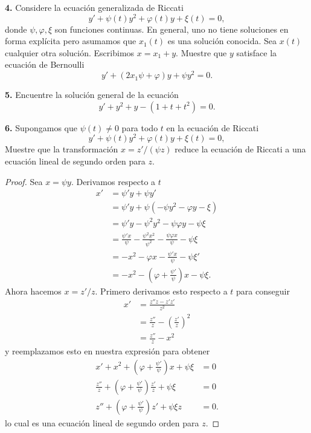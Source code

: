 \documentclass{article}
\newenvironment{statement}[1]{\smallskip\noindent\color[rgb]{1.00,0.00,0.50} {\bf #1.}}{}
\theoremstyle{definition}
\theoremstyle{remark}
\begin{document}
\begin{statement}{4}
  Considere la ecuaci\'on generalizada de Riccati
  \[
    y' + \psi(t) y^2 + \varphi(t) y + \xi(t) = 0,
  \]
  donde $\psi, \varphi, \xi$ son funciones continuas.
  En general, uno no tiene soluciones en forma expl\'icita pero asumamos que
  $x_1(t)$ es una soluci\'on conocida. Sea $x(t)$ cualquier otra soluci\'on.
  Escribimos $x = x_1 + y$. Muestre que $y$ satisface la ecuaci\'on de Bernoulli
  \[
    y' + (2 x_1 \psi + \varphi) y + \psi y^2 = 0.  
  \]
\end{statement}

\begin{statement}{5}
  Encuentre la soluci\'on general de la ecuaci\'on
  \[
    y' + y^2 + y - (1 + t + t^2) = 0.  
  \]
\end{statement}

\begin{statement}{6}
  Supongamos que $\psi(t) \neq 0$ para todo $t$ en la ecuaci\'on de Riccati
  \[
    y' + \psi(t) y^2 + \varphi(t) y + \xi(t) = 0,
  \]
  Muestre que la transformaci\'on $x = z' / (\psi z)$ reduce la ecuaci\'on
  de Riccati a una ecuaci\'on lineal de segundo orden para $z$.
\end{statement}

\begin{proof}
  Sea $x = \psi y$. Derivamos respecto a $t$
  \begin{align*}
    x' &= \psi' y + \psi y'\\
    &= \psi' y + \psi(-\psi y^2 - \varphi y - \xi)\\
    &= \psi' y - \psi^2 y^2 - \psi \varphi y - \psi \xi\\
    &= \frac{\psi' x}{\psi} - \frac{\psi^2 x^2}{\psi^2} - \frac{\psi \varphi x}{\psi} - \psi \xi\\
    &= -x^2 - \varphi x - \frac{\psi' x}{\psi} - \psi \xi'\\
    &= -x^2 - \left(\varphi + \frac{\psi'}{\psi}\right) x - \psi \xi.
  \end{align*}
  Ahora hacemos $x = z' / z$. Primero derivamos esto respecto a $t$ para conseguir
  \begin{align*}
    x' &= \frac{z'' z - z' z'}{z^2}\\
    &= \frac{z''}{z} - \left(\frac{z'}{z}\right)^2\\
    &= \frac{z''}{z} - x^2
  \end{align*}
  y reemplazamos esto en nuestra expresi\'on para obtener
  \begin{align*}
    x' + x^2 + \left(\varphi + \frac{\psi'}{\psi}\right) x + \psi \xi &= 0\\
    \frac{z''}{z} + \left(\varphi + \frac{\psi'}{\psi}\right) \frac{z'}{z} + \psi \xi &= 0\\
    z'' + \left(\varphi + \frac{\psi'}{\psi}\right) z' + \psi \xi z &= 0.
  \end{align*}
  lo cual es una ecuaci\'on lineal de segundo orden para $z$.
\end{proof}
\end{document}
